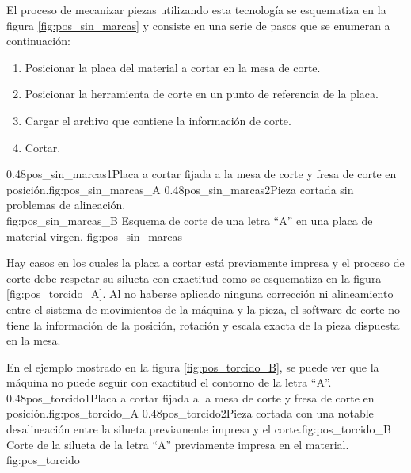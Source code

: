          El proceso de mecanizar piezas utilizando esta tecnología se esquematiza en la figura \ref{fig:pos_sin_marcas} y consiste en una serie de pasos que se enumeran a continuación:

\begin{enumerate}
   \item{Posicionar la placa del material a cortar en la mesa de corte.}
   \item{Posicionar la herramienta de corte en un punto de referencia de la placa.}
   \item{Cargar el archivo que contiene la información de corte.}
   \item{Cortar.}
\end{enumerate}

\subfigab
         {0.48}{pos_sin_marcas1}{Placa a cortar fijada a la mesa de corte y fresa de corte en posición.}{fig:pos_sin_marcas_A}
         {0.48}{pos_sin_marcas2}{Pieza cortada sin problemas de alineación.\\ \vphantom{1}}{fig:pos_sin_marcas_B}
         {Esquema de corte de una letra ``A'' en una placa de material virgen.}
         {fig:pos_sin_marcas}

         Hay casos en los cuales la placa a cortar está previamente impresa y el proceso de corte debe respetar su silueta con exactitud como se esquematiza en la figura \ref{fig:pos_torcido_A}.
         Al no haberse aplicado ninguna corrección ni alineamiento entre el sistema de movimientos de la máquina y la pieza, el software de corte no tiene la información de la posición, rotación y escala exacta de la pieza dispuesta en la mesa. \par
         En el ejemplo mostrado en la figura \ref{fig:pos_torcido_B}, se puede ver que la máquina no puede seguir con exactitud el contorno de la letra ``A''.\\


\subfigab
         {0.48}{pos_torcido1}{Placa a cortar fijada a la mesa de corte y fresa de corte en posición.}{fig:pos_torcido_A}
         {0.48}{pos_torcido2}{Pieza cortada con una notable desalineación entre la silueta previamente impresa y el corte.}{fig:pos_torcido_B}
         {Corte de la silueta de la letra ``A'' previamente impresa en el material.}
         {fig:pos_torcido}

